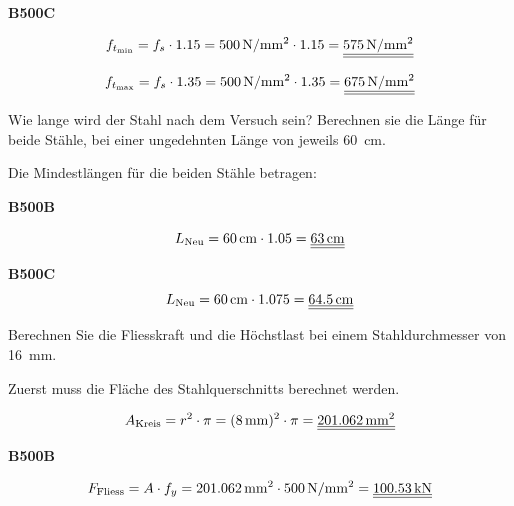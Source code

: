 \begin{questions}
\begin{solution}
        \textbf{B500C}

        \begin{equation*}
            f_{t_\text{min}} = f_s \cdot 1.15 = \myNmm{500} \cdot 1.15 = \FinRes{\myNmm{575}}
        \end{equation*}


        \begin{equation*}
            f_{t_\text{max}} = f_s \cdot 1.35 = \myNmm{500} \cdot 1.35 = \FinRes{\myNmm{675}}
        \end{equation*}

    \end{solution}

    \question
    Wie lange wird der Stahl nach dem Versuch sein? Berechnen sie die Länge für beide Stähle, bei einer ungedehnten Länge von jeweils \SI{60}{\cm}.


    \begin{solution}
        Die Mindestlängen für die beiden Stähle betragen:

        \textbf{B500B}

        \begin{equation*}
            L_{\text{Neu}} = \SI{60}{\cm} \cdot 1.05 = \FinRes{\SI{63}{\cm}}
        \end{equation*}

        \textbf{B500C}
        \begin{equation*}
            L_{\text{Neu}} = \SI{60}{\cm} \cdot 1.075 = \FinRes{\SI{64.5}{\cm}}
        \end{equation*}
    \end{solution}

    \question
    Berechnen Sie die Fliesskraft und die Höchstlast bei einem Stahldurchmesser von \SI{16}{\mm}.

    \begin{solution}
        Zuerst muss die Fläche des Stahlquerschnitts berechnet werden.

        \begin{equation*}
            A_{\text{Kreis}} = r^2 \cdot \pi = (\SI{8}{\mm})^2 \cdot \pi = \FinRes{\SI{201.062}{\mm^2}}
        \end{equation*}

        \textbf{B500B}

        \begin{equation*}
            F_{\text{Fliess}} = A \cdot f_y = \SI{201.062}{\mm^2} \cdot \myNmm{500} = \FinRes{\SI{100.53}{\kilo\N}}
        \end{equation*}


\end{solution}
\end{questions}
